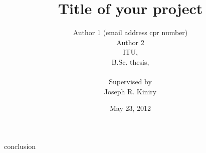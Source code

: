 \documentclass[12pt,a4paper]{report}
\author{Author 1 (email address cpr number) \\ Author 2 \\ 
		ITU, \\
		B.Sc. thesis, \\ \\
		Supervised by \\
		Joseph R. Kiniry}
\title{Title of your project}
\date{May 23, 2012}
\begin{document}
\maketitle
\tableofcontents



{conclusion}


\end{document}
